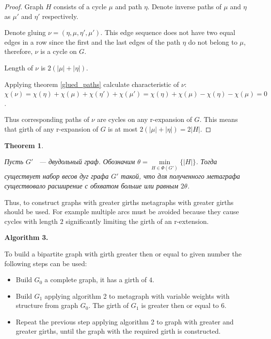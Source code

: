 \documentclass[14pt]{mmcs-article}
\newtheorem{theorem}{Theorem}
\begin{document}
\begin{proof}
    Graph $H$ consists of a cycle $\mu$ and path $\eta$. Denote inverse paths of $\mu$ and $\eta$ as $\mu'$ and $\eta'$ respectively.

    Denote gluing $\nu = (\eta, \mu, \eta', \mu')$. This edge sequence does not have two equal edges in a row since the first and the last edges of the path $\eta$ do not belong to $\mu$, therefore, $\nu$ is a cycle on $G$.

    Length of $\nu$ is $2(|\mu| + |\eta|)$.

    Applying theorem \ref{glued_paths} calculate characteristic of $\nu$: $\chi(\nu) = \chi(\eta) + \chi(\mu) + \chi(\eta') + \chi(\mu') = \chi(\eta) + \chi(\mu) - \chi(\eta) - \chi(\mu) = 0$.

    Thus corresponding paths of $\nu$ are cycles on any r-expansion of $G$. This means that girth of any r-expansion of $G$ is at most $2(|\mu| + |\eta|) = 2|H|$.
\end{proof}


\begin{theorem}\label{theorem_cycle_expansion}

    Пусть $G'$ ~--- двудольный граф. Обозначим $\theta = \min\limits_{H \in \Phi(G')} \{ |H| \}$. Тогда существует набор весов дуг графа $G'$ такой, что для полученного метаграфа существовало расширение с обхватом больше или равным $2 \theta$.

\end{theorem}

Thus, to construct graphs with greater girths metagraphs with greater girths should be used. For example multiple arcs must be avoided because they cause cycles with length $2$ significantly limiting the girth of an r-extension.

\textbf{Algorithm 3.}

To build a bipartite graph with girth greater then or equal to given number the following steps can be used: 

\begin{itemize}
    \item Build $G_0$ a complete graph, it has a girth of $4$.
    \item Build $G_1$ applying algorithm 2 to metagraph with variable weights with structure from graph $G_0$. The girth of $G_1$ is greater then or equal to $6$.
    \item Repeat the previous step applying algorithm 2 to graph with greater and greater girths, until the graph with the required girth is constructed.  
\end{itemize}
\end{document}
